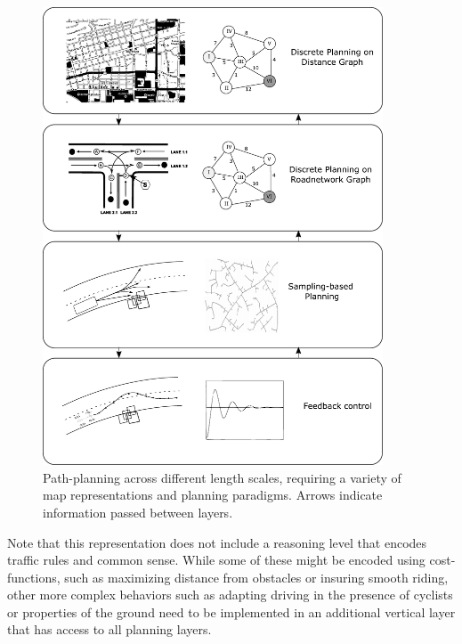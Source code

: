 \begin{figure}
\centering
\includegraphics[width=0.9\textwidth]{figs/planninglayers}
\caption{Path-planning across different length scales, requiring a variety of map representations and planning paradigms. Arrows indicate information passed between layers.\label{fig:planninglayers}}
\end{figure}

Note that this representation does not include a reasoning level that encodes traffic rules and common sense. While some of these might be encoded using cost-functions, such as maximizing distance from obstacles or insuring smooth riding, other more complex behaviors such as adapting driving in the presence of cyclists or properties of the ground need to be implemented in an additional vertical layer that has access to all planning layers.

